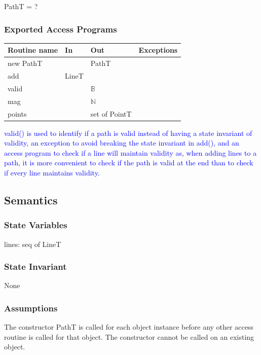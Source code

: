 \documentclass[12pt]{article}
\newcommand{\note}{\noindent \textcolor{blue}}
\begin{document}
PathT = ?

\subsubsection* {Exported Access Programs}

\begin{tabular}{| l | l | l | l |}
	\hline
	\textbf{Routine name} & \textbf{In} & \textbf{Out} & \textbf{Exceptions}\\
	\hline
	new PathT & ~ & PathT & ~ \\
	\hline
	add & LineT & ~ & ~\\
	\hline
	valid & ~ & $\mathbb{B}$ & ~\\
	\hline
	mag & ~ & $\mathbb{N}$ & ~\\
	\hline
	points & ~ & set of PointT & ~\\
	\hline
\end{tabular}

\note{valid() is used to identify if a path is valid instead of having a state invariant of validity, an exception to avoid breaking the state invariant in add(), and an access program to check if a line will maintain validity as, when adding lines to a path, it is more convenient to check if the path is valid at the end than to check if every line maintains validity. }\\

\subsection* {Semantics}

\subsubsection* {State Variables}

lines: seq of LineT

\subsubsection* {State Invariant}

None

\subsubsection* {Assumptions}

The constructor PathT is called for each object instance before any other
access routine is called for that object.  The constructor cannot be called on
an existing object.
\end{document}
